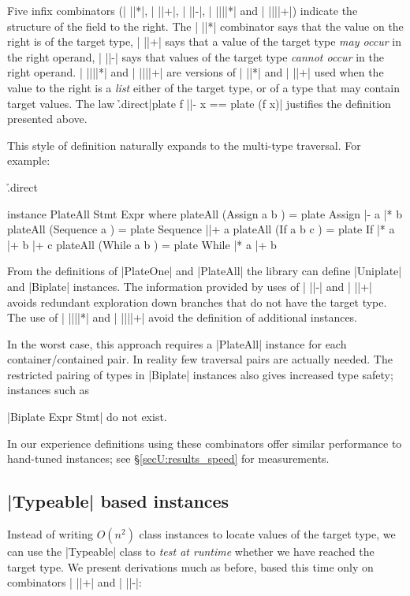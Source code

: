 Five infix combinators (| ||*|, | ||+|, | ||-|, | ||||*| and | ||||+|) indicate the structure of the field to the right. The | ||*| combinator says that the value on the right is of the target type, | ||+| says that a value of the target type \textit{may occur} in the right operand, | ||-| says that values of the target type \textit{cannot occur} in the right operand. | ||||*| and | ||||+| are versions of | ||*| and | ||+| used when the value to the right is a \textit{list} either of the target type, or of a type that may contain target values. The law \h{.direct}|plate f ||- x == plate (f x)| justifies the definition presented above.

This style of definition naturally expands to the multi-type traversal. For example:

\begin{onepage}
\h{.direct}\begin{code}
instance PlateAll Stmt Expr where
    plateAll (Assign    a b    ) = plate Assign    |-   a |*  b
    plateAll (Sequence  a      ) = plate Sequence  ||+  a
    plateAll (If        a b c  ) = plate If        |*   a |+  b |+ c
    plateAll (While     a b    ) = plate While     |*   a |+  b
\end{code}
\end{onepage}

From the definitions of |PlateOne| and |PlateAll| the library can define |Uniplate| and |Biplate| instances. The information provided by uses of | ||-| and | ||+| avoids redundant exploration down branches that do not have the target type. The use of | ||||*| and | ||||+| avoid the definition of additional instances.

In the worst case, this approach requires a |PlateAll| instance for each container/contained pair. In reality few traversal pairs are actually needed. The restricted pairing of types in |Biplate| instances also gives increased type safety; instances such as \ignore|Biplate Expr Stmt| do not exist.

In our experience definitions using these combinators offer similar performance to hand-tuned instances; see \S\ref{secU:results_speed} for measurements.


\subsection{|Typeable| based instances}
\label{secU:implement_playtypeable}

Instead of writing $O(n^2)$ class instances to locate values of the target type, we can use the |Typeable| class to \textit{test at runtime} whether we have reached the target type. We present derivations much as before, based this time only on combinators | ||+| and | ||-|:

